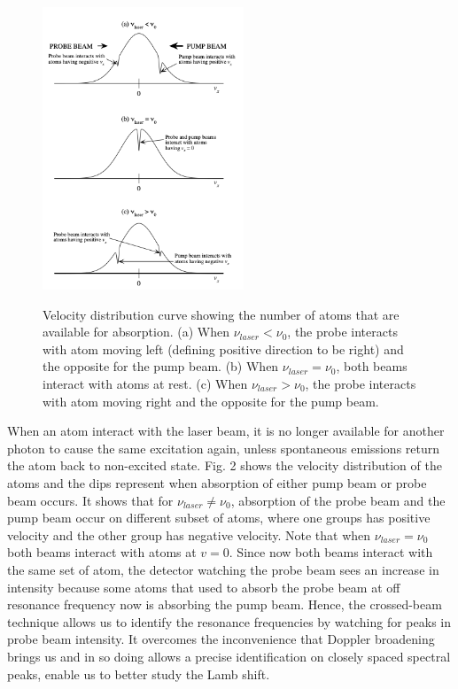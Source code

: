 \documentclass[11pt]{article}
\begin{document}
\begin{figure}[H]
\begin{center}
\includegraphics[width=6cm]{hole_burning}
\label{Fig. 2}
\caption{Velocity distribution curve showing the number of atoms that are available for absorption. (a) When $\nu_{laser} < \nu_0$, the probe interacts with atom moving left (defining positive direction to be right) and the opposite for the pump beam. (b) When $\nu_{laser} = \nu_0$, both beams interact with atoms at rest. (c) When $\nu_{laser} > \nu_0$, the probe interacts with atom moving right and the opposite for the pump beam.}
\end{center}
\end{figure}

When an atom interact with the laser beam, it is no longer available for another photon to cause the same excitation again, unless spontaneous emissions return the atom back to non-excited state. Fig. 2 shows the velocity distribution of the atoms and the dips represent when absorption of either pump beam or probe beam occurs. It shows that for $\nu_{laser} \ne \nu_0$, absorption of the probe beam and the pump beam occur on different subset of atoms, where one groups has positive velocity and the other group has negative velocity. Note that when $\nu_{laser} = \nu_0$ both beams interact with atoms at $v=0$. Since now both beams interact with the same set of atom, the detector watching the probe beam sees an increase in intensity because some atoms that used to absorb the probe beam at off resonance frequency now is absorbing the pump beam. Hence, the crossed-beam technique allows us to identify the resonance frequencies by watching for peaks in probe beam intensity. It overcomes the inconvenience that Doppler broadening brings us and in so doing allows a precise identification on closely spaced spectral peaks, enable us to better study the Lamb shift.
\bigskip
\end{document}
